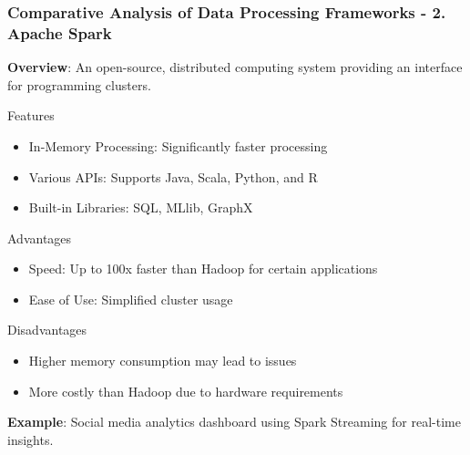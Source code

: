 \documentclass[aspectratio=169]{beamer}
\begin{document}
\begin{frame}[fragile]
    \frametitle{Comparative Analysis of Data Processing Frameworks - 2. Apache Spark}
    \textbf{Overview}: An open-source, distributed computing system providing an interface for programming clusters.

    \begin{block}{Features}
        \begin{itemize}
            \item In-Memory Processing: Significantly faster processing
            \item Various APIs: Supports Java, Scala, Python, and R
            \item Built-in Libraries: SQL, MLlib, GraphX
        \end{itemize}
    \end{block}
    
    \begin{block}{Advantages}
        \begin{itemize}
            \item Speed: Up to 100x faster than Hadoop for certain applications
            \item Ease of Use: Simplified cluster usage
        \end{itemize}
    \end{block}
    
    \begin{block}{Disadvantages}
        \begin{itemize}
            \item Higher memory consumption may lead to issues
            \item More costly than Hadoop due to hardware requirements
        \end{itemize}
    \end{block}
    
    \textbf{Example}: Social media analytics dashboard using Spark Streaming for real-time insights.
\end{frame}
\end{document}
